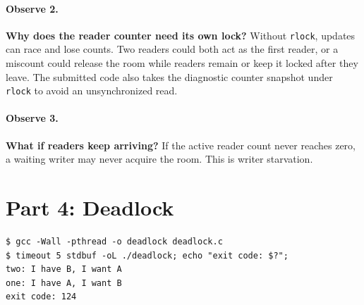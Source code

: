 \documentclass[12pt,a4paper]{article}
\begin{document}
\paragraph{Observe 2.} \textbf{Why does the reader counter need its own lock?} Without \texttt{rlock}, updates can race and lose counts. Two readers could both act as the first reader, or a miscount could release the room while readers remain or keep it locked after they leave. The submitted code also takes the diagnostic counter snapshot under \texttt{rlock} to avoid an unsynchronized read.

\paragraph{Observe 3.} \textbf{What if readers keep arriving?} If the active reader count never reaches zero, a waiting writer may never acquire the room. This is writer starvation.

\section{Part 4: Deadlock}

\begin{lstlisting}[caption={Circular wait with opposite lock acquisition order}]
$ gcc -Wall -pthread -o deadlock deadlock.c
$ timeout 5 stdbuf -oL ./deadlock; echo "exit code: $?";
two: I have B, I want A
one: I have A, I want B
exit code: 124
\end{lstlisting}
\end{document}
